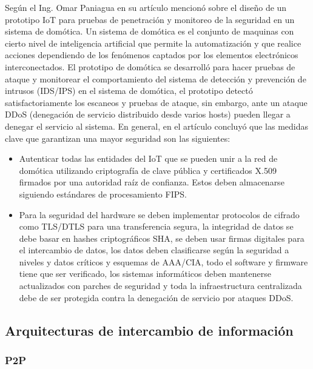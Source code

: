 \documentclass{article}
\begin{document}
        Según el Ing. Omar Paniagua en su artículo \cite{villagomezdiseno} mencionó sobre el diseño de un prototipo IoT para pruebas de penetración y monitoreo de la seguridad en un sistema de domótica. Un sistema de domótica es el conjunto de maquinas con cierto nivel de inteligencia artificial que permite la automatización y que realice acciones dependiendo de los fenómenos captados por los elementos electrónicos interconectados. El prototipo de domótica se desarrolló para hacer pruebas de ataque y monitorear el comportamiento del sistema de detección y prevención de intrusos (IDS/IPS) en el sistema de domótica, el prototipo detectó satisfactoriamente los escaneos y pruebas de ataque, sin embargo, ante un ataque DDoS (denegación de servicio distribuido desde varios hosts) pueden llegar a denegar el servicio al sistema. \cite{villagomezdiseno}  En general, en el artículo concluyó que las medidas clave que garantizan una mayor seguridad son las siguientes:
        \begin{itemize}
            \item Autenticar todas las entidades del IoT que se pueden unir a la red de domótica utilizando criptografía de clave pública y certificados X.509 firmados por una autoridad raíz de confianza. Estos deben almacenarse siguiendo estándares de procesamiento FIPS. \cite{villagomezdiseno}
            \item Para la seguridad del hardware se deben implementar protocolos de cifrado como TLS/DTLS para una transferencia segura, la integridad de datos se debe basar en hashes criptográficos SHA, se deben usar firmas digitales para el intercambio de datos, los datos deben clasificarse según la seguridad a niveles y datos críticos y esquemas de AAA/CIA, todo el software y firmware tiene que ser verificado, los sistemas informáticos deben mantenerse actualizados con parches de seguridad y toda la infraestructura centralizada debe de ser protegida contra la denegación de servicio por ataques DDoS. \cite{villagomezdiseno}
        \end{itemize}

    \subsection{Arquitecturas de intercambio de información}

        \subsubsection{P2P}
\end{document}
